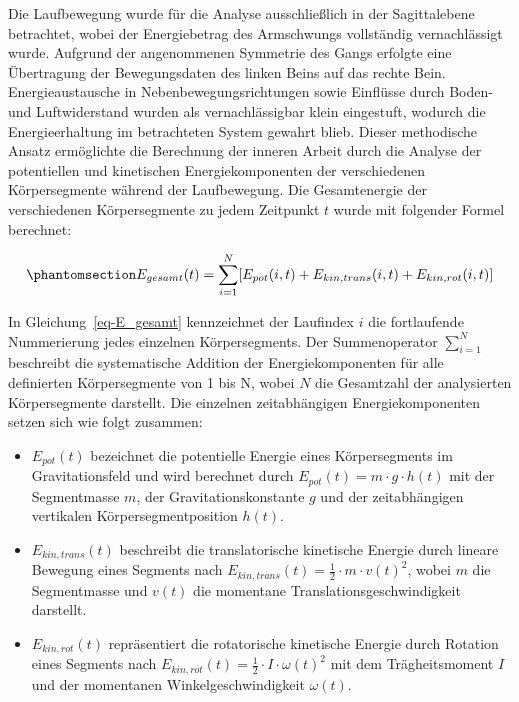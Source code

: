 \documentclass[
  letterpaper,
  DIV=11]{scrartcl}
\begin{document}
Die Laufbewegung wurde für die Analyse ausschließlich in der
Sagittalebene betrachtet, wobei der Energiebetrag des Armschwungs
vollständig vernachlässigt wurde. Aufgrund der angenommenen Symmetrie
des Gangs erfolgte eine Übertragung der Bewegungsdaten des linken Beins
auf das rechte Bein. Energieaustausche in Nebenbewegungsrichtungen sowie
Einflüsse durch Boden- und Luftwiderstand wurden als vernachlässigbar
klein eingestuft, wodurch die Energieerhaltung im betrachteten System
gewahrt blieb. Dieser methodische Ansatz ermöglichte die Berechnung der
inneren Arbeit durch die Analyse der potentiellen und kinetischen
Energiekomponenten der verschiedenen Körpersegmente während der
Laufbewegung. Die Gesamtenergie der verschiedenen Körpersegmente zu
jedem Zeitpunkt \(t\) wurde mit folgender Formel berechnet:

\begin{equation}\phantomsection\label{eq-E_gesamt}{E_{gesamt}(t) = \sum_{i=1}^{N} [E_{pot}(i,t) + E_{kin,trans}(i,t) + E_{kin,rot}(i,t)]}\end{equation}

In Gleichung~\ref{eq-E_gesamt} kennzeichnet der Laufindex \(i\) die
fortlaufende Nummerierung jedes einzelnen Körpersegments. Der
Summenoperator \(\sum_{i=1}^{N}\) beschreibt die systematische Addition
der Energiekomponenten für alle definierten Körpersegmente von 1 bis N,
wobei \(N\) die Gesamtzahl der analysierten Körpersegmente darstellt.
Die einzelnen zeitabhängigen Energiekomponenten setzen sich wie folgt
zusammen:

\begin{itemize}
\item
  \(E_{pot}(t)\) bezeichnet die potentielle Energie eines Körpersegments
  im Gravitationsfeld und wird berechnet durch
  \(E_{pot}(t) = m \cdot g \cdot h(t)\) mit der Segmentmasse \(m\), der
  Gravitationskonstante \(g\) und der zeitabhängigen vertikalen
  Körpersegmentposition \(h(t)\).
\item
  \(E_{kin,trans}(t)\) beschreibt die translatorische kinetische Energie
  durch lineare Bewegung eines Segments nach
  \(E_{kin,trans}(t) = \frac{1}{2} \cdot m \cdot v(t)^2\), wobei \(m\)
  die Segmentmasse und \(v(t)\) die momentane
  Translationsgeschwindigkeit darstellt.
\item
  \(E_{kin,rot}(t)\) repräsentiert die rotatorische kinetische Energie
  durch Rotation eines Segments nach
  \(E_{kin,rot}(t) = \frac{1}{2} \cdot I \cdot \omega(t)^2\) mit dem
  Trägheitsmoment \(I\) und der momentanen Winkelgeschwindigkeit
  \(\omega(t)\).
\end{itemize}
\end{document}
